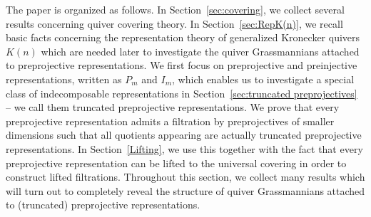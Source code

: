 \documentclass{amsart}
\numberwithin{equation}{section}
\begin{document}
The paper is organized as follows.
In Section~\ref{sec:covering}, we collect several results concerning quiver covering theory.
In Section~\ref{sec:RepK(n)}, we recall basic facts concerning the representation theory of generalized Kronecker quivers $K(n)$ which are needed later to investigate the quiver Grassmannians attached to preprojective representations.
We first focus on preprojective and preinjective representations, written as $P_m$ and $I_m$, which enables us to investigate a special class of indecomposable representations in Section~\ref{sec:truncated preprojectives} -- we call them truncated preprojective representations.
We prove that every preprojective representation admits a filtration by preprojectives of smaller dimensions such that all quotients appearing are actually truncated preprojective representations.
In Section~\ref{Lifting}, we use this together with the fact that every preprojective representation can be lifted to the universal covering in order to construct lifted filtrations.
Throughout this section, we collect many results which will turn out to completely reveal the structure of quiver Grassmannians attached to (truncated) preprojective representations.
\end{document}
